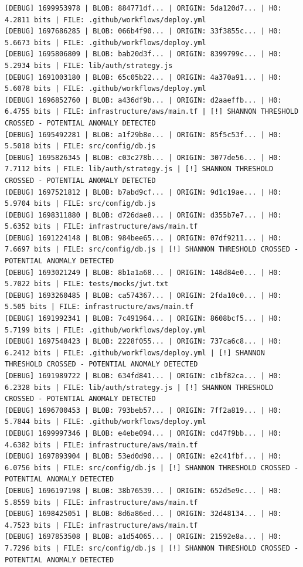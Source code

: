 \documentclass[12pt, a4paper, oneside]{report}
\begin{document}
\begin{lstlisting}[basicstyle=\tiny\ttfamily]
[DEBUG] 1699953978 | BLOB: 884771df... | ORIGIN: 5da120d7... | H0: 4.2811 bits | FILE: .github/workflows/deploy.yml
[DEBUG] 1697686285 | BLOB: 066b4f90... | ORIGIN: 33f3855c... | H0: 5.6673 bits | FILE: .github/workflows/deploy.yml
[DEBUG] 1695806809 | BLOB: bab20d3f... | ORIGIN: 8399799c... | H0: 5.2934 bits | FILE: lib/auth/strategy.js
[DEBUG] 1691003180 | BLOB: 65c05b22... | ORIGIN: 4a370a91... | H0: 5.6078 bits | FILE: .github/workflows/deploy.yml
[DEBUG] 1696852760 | BLOB: a436df9b... | ORIGIN: d2aaeffb... | H0: 6.4755 bits | FILE: infrastructure/aws/main.tf | [!] SHANNON THRESHOLD CROSSED - POTENTIAL ANOMALY DETECTED
[DEBUG] 1695492281 | BLOB: a1f29b8e... | ORIGIN: 85f5c53f... | H0: 5.5018 bits | FILE: src/config/db.js
[DEBUG] 1695826345 | BLOB: c03c278b... | ORIGIN: 3077de56... | H0: 7.7112 bits | FILE: lib/auth/strategy.js | [!] SHANNON THRESHOLD CROSSED - POTENTIAL ANOMALY DETECTED
[DEBUG] 1697521812 | BLOB: b7abd9cf... | ORIGIN: 9d1c19ae... | H0: 5.9704 bits | FILE: src/config/db.js
[DEBUG] 1698311880 | BLOB: d726dae8... | ORIGIN: d355b7e7... | H0: 5.6352 bits | FILE: infrastructure/aws/main.tf
[DEBUG] 1691224148 | BLOB: 984bee65... | ORIGIN: 07df9211... | H0: 7.6697 bits | FILE: src/config/db.js | [!] SHANNON THRESHOLD CROSSED - POTENTIAL ANOMALY DETECTED
[DEBUG] 1693021249 | BLOB: 8b1a1a68... | ORIGIN: 148d84e0... | H0: 5.7022 bits | FILE: tests/mocks/jwt.txt
[DEBUG] 1693260485 | BLOB: ca574367... | ORIGIN: 2fda10c0... | H0: 5.505 bits | FILE: infrastructure/aws/main.tf
[DEBUG] 1691992341 | BLOB: 7c491964... | ORIGIN: 8608bcf5... | H0: 5.7199 bits | FILE: .github/workflows/deploy.yml
[DEBUG] 1697548423 | BLOB: 2228f055... | ORIGIN: 737ca6c8... | H0: 6.2412 bits | FILE: .github/workflows/deploy.yml | [!] SHANNON THRESHOLD CROSSED - POTENTIAL ANOMALY DETECTED
[DEBUG] 1691989722 | BLOB: 634fd841... | ORIGIN: c1bf82ca... | H0: 6.2328 bits | FILE: lib/auth/strategy.js | [!] SHANNON THRESHOLD CROSSED - POTENTIAL ANOMALY DETECTED
[DEBUG] 1696700453 | BLOB: 793beb57... | ORIGIN: 7ff2a819... | H0: 5.7844 bits | FILE: .github/workflows/deploy.yml
[DEBUG] 1699997346 | BLOB: e4ebe094... | ORIGIN: cd47f9bb... | H0: 4.6382 bits | FILE: infrastructure/aws/main.tf
[DEBUG] 1697893904 | BLOB: 53ed0d90... | ORIGIN: e2c41fbf... | H0: 6.0756 bits | FILE: src/config/db.js | [!] SHANNON THRESHOLD CROSSED - POTENTIAL ANOMALY DETECTED
[DEBUG] 1696197198 | BLOB: 38b76539... | ORIGIN: 652d5e9c... | H0: 5.8559 bits | FILE: infrastructure/aws/main.tf
[DEBUG] 1698425051 | BLOB: 8d6a86ed... | ORIGIN: 32d48134... | H0: 4.7523 bits | FILE: infrastructure/aws/main.tf
[DEBUG] 1697853508 | BLOB: a1d54065... | ORIGIN: 21592e8a... | H0: 7.7296 bits | FILE: src/config/db.js | [!] SHANNON THRESHOLD CROSSED - POTENTIAL ANOMALY DETECTED
\end{lstlisting}
\end{document}
